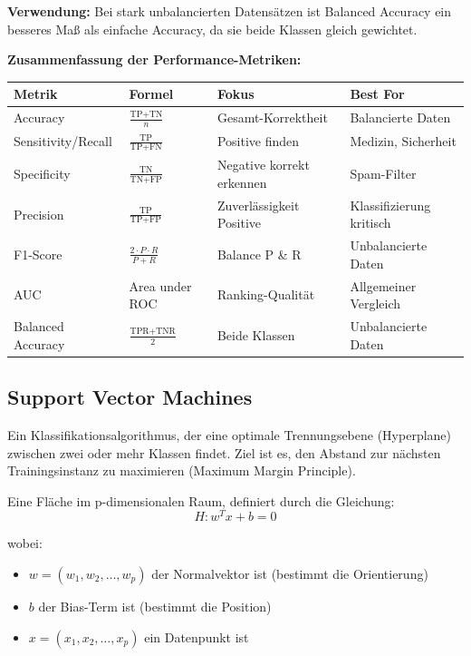 \textbf{Verwendung:} Bei stark unbalancierten Datensätzen ist Balanced Accuracy ein besseres Maß als einfache Accuracy, da sie beide Klassen gleich gewichtet.

\textbf{Zusammenfassung der Performance-Metriken:}

\begin{table}[h]
    \centering
    \small
    \begin{tabular}{|l|l|l|l|}
        \hline
        \textbf{Metrik} & \textbf{Formel} & \textbf{Fokus} & \textbf{Best For} \\
        \hline
        Accuracy & $\frac{\text{TP+TN}}{n}$ & Gesamt-Korrektheit & Balancierte Daten \\
        \hline
        Sensitivity/Recall & $\frac{\text{TP}}{\text{TP+FN}}$ & Positive finden & Medizin, Sicherheit \\
        \hline
        Specificity & $\frac{\text{TN}}{\text{TN+FP}}$ & Negative korrekt erkennen & Spam-Filter \\
        \hline
        Precision & $\frac{\text{TP}}{\text{TP+FP}}$ & Zuverlässigkeit Positive & Klassifizierung kritisch \\
        \hline
        F1-Score & $\frac{2 \cdot P \cdot R}{P+R}$ & Balance P \& R & Unbalancierte Daten \\
        \hline
        AUC & Area under ROC & Ranking-Qualität & Allgemeiner Vergleich \\
        \hline
        Balanced Accuracy & $\frac{\text{TPR+TNR}}{2}$ & Beide Klassen & Unbalancierte Daten \\
        \hline
    \end{tabular}
\end{table}

\newpage

\subsection{Support Vector Machines}

Ein Klassifikationsalgorithmus, der eine optimale Trennungsebene (Hyperplane) zwischen zwei oder mehr Klassen findet. Ziel ist es, den Abstand zur nächsten Trainingsinstanz zu maximieren (Maximum Margin Principle).

Eine Fläche im p-dimensionalen Raum, definiert durch die Gleichung:
$$H: w^T x + b = 0$$

wobei:
\begin{itemize}[leftmargin=1.5em]
    \item $w = (w_1, w_2, \ldots, w_p)$ der Normalvektor ist (bestimmt die Orientierung)
    \item $b$ der Bias-Term ist (bestimmt die Position)
    \item $x = (x_1, x_2, \ldots, x_p)$ ein Datenpunkt ist
\end{itemize}

